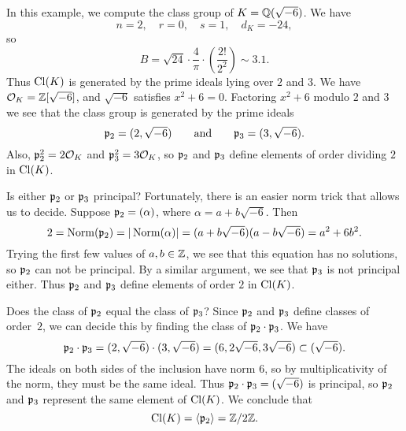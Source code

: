 \begin{example}
In this example, we compute the class group of $K=\mathbb{Q}(\sqrt{-6})$.
We have
$$
  n = 2, \quad r=0, \quad s=1, \quad d_K = -24,
$$
so 
$$
  B = \sqrt{24} \cdot \frac{4}{\pi} \cdot 
       \left(\frac{2!}{2^2}\right)\sim 3.1.
$$ 
Thus $\operatorname{Cl}(K)$ is generated by the prime ideals lying over $2$ and $3$.
We have $\mathcal{O}_K=\mathbb{Z}[\sqrt{-6}]$, and $\sqrt{-6}$ satisfies $x^2+6=0$.
Factoring $x^2+6$ modulo $2$ and $3$ we see that the class group
is generated by the prime ideals
$$
  \mathfrak{p}_2 = (2,\sqrt{-6})\qquad\text{and}\qquad
  \mathfrak{p}_3 = (3,\sqrt{-6}).
$$
Also, $\mathfrak{p}_2^2 = 2\mathcal{O}_K$ and $\mathfrak{p}_3^2=3\mathcal{O}_K$, so 
$\mathfrak{p}_2$ and $\mathfrak{p}_3$ define elements of order
dividing $2$ in $\operatorname{Cl}(K)$.  

Is either $\mathfrak{p}_2$ or $\mathfrak{p}_3$ principal?  Fortunately,
there is an easier norm trick that allows us to decide.
Suppose $\mathfrak{p}_2 = (\alpha)$, where $\alpha=a+b\sqrt{-6}$.
Then $$2=\operatorname{Norm}(\mathfrak{p}_2) = |\operatorname{Norm}(\alpha)| = (a+b\sqrt{-6})(a-b\sqrt{-6})
   = a^2 + 6b^2.$$
Trying the first few values of $a, b\in \mathbb{Z}$, we see that this
equation has no solutions, so $\mathfrak{p}_2$ can not
be principal.  By a similar argument, we see that $\mathfrak{p}_3$
is not principal either.  Thus $\mathfrak{p}_2$ and $\mathfrak{p}_3$ define
elements of order $2$ in $\operatorname{Cl}(K)$.

Does the class of $\mathfrak{p}_2$ equal the class of $\mathfrak{p}_3$?
Since $\mathfrak{p}_2$ and $\mathfrak{p}_3$ define classes of order~$2$,
we can decide this by finding the class of $\mathfrak{p}_2\cdot \mathfrak{p}_3$.
We have
$$
 \mathfrak{p}_2\cdot \mathfrak{p}_3 =  (2,\sqrt{-6})\cdot (3,\sqrt{-6})
   = (6,2\sqrt{-6}, 3\sqrt{-6}) \subset (\sqrt{-6}).$$
The ideals on both sides of the inclusion have norm $6$,
so by multiplicativity of the norm, they must be the
same ideal.  Thus $\mathfrak{p}_2\cdot \mathfrak{p}_3=(\sqrt{-6})$ is principal,
so $\mathfrak{p}_2$ and $\mathfrak{p}_3$ represent the same element of $\operatorname{Cl}(K)$.
We conclude that $$\operatorname{Cl}(K) = \langle \mathfrak{p}_2 \rangle = \mathbb{Z}/2\mathbb{Z}.$$
\end{example}

